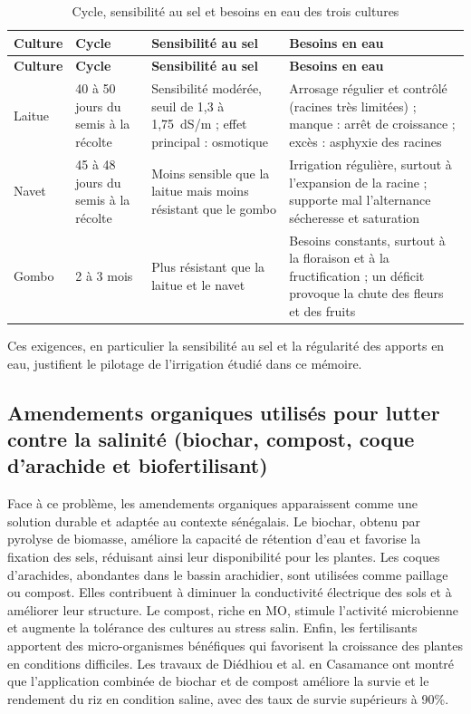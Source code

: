 {\small
\begin{longtable}{|p{2cm}|p{3.2cm}|p{4.4cm}|p{4.4cm}|}
    \caption{Cycle, sensibilité au sel et besoins en eau des trois cultures}
    \label{tab:cultures_sel_eau} \\
    \hline
    \textbf{Culture} & \textbf{Cycle} & \textbf{Sensibilité au sel} & \textbf{Besoins en eau} \\
    \hline
    \endfirsthead
    \hline
    \textbf{Culture} & \textbf{Cycle} & \textbf{Sensibilité au sel} & \textbf{Besoins en eau} \\
    \hline
    \endhead
    Laitue & 40 à 50 jours du semis à la récolte & Sensibilité modérée, seuil de 1,3 à 1,75~dS/m ; effet principal : osmotique & Arrosage régulier et contrôlé (racines très limitées) ; manque : arrêt de croissance ; excès : asphyxie des racines \\
    \hline
    Navet & 45 à 48 jours du semis à la récolte & Moins sensible que la laitue mais moins résistant que le gombo & Irrigation régulière, surtout à l'expansion de la racine ; supporte mal l'alternance sécheresse et saturation \\
    \hline
    Gombo & 2 à 3 mois & Plus résistant que la laitue et le navet & Besoins constants, surtout à la floraison et à la fructification ; un déficit provoque la chute des fleurs et des fruits \\
    \hline
\end{longtable}
}

Ces exigences, en particulier la sensibilité au sel et la régularité des apports en eau, justifient le pilotage de l’irrigation étudié dans ce mémoire.

\subsection{Amendements organiques utilisés pour lutter contre la salinité (biochar, compost, coque d’arachide et biofertilisant)}
Face à ce problème, les amendements organiques apparaissent comme une solution durable et adaptée au contexte sénégalais. Le biochar, obtenu par  pyrolyse de biomasse, améliore la capacité de rétention d'eau et favorise la fixation des sels, réduisant ainsi leur disponibilité pour les plantes. Les coques d’arachides, abondantes dans le bassin arachidier, sont utilisées comme paillage ou compost. Elles contribuent à diminuer la conductivité électrique des sols et à améliorer leur structure. Le compost, riche en MO, stimule l'activité microbienne et augmente la tolérance des cultures au stress salin. Enfin, les fertilisants apportent des  micro-organismes bénéfiques qui favorisent la croissance des plantes en conditions difficiles. Les travaux de Diédhiou et al. \cite{diedhiou_investigation_2023} en Casamance ont montré que l’application combinée de biochar et de compost améliore la survie et le rendement du riz en condition saline, avec des taux de survie supérieurs à 90\%.

